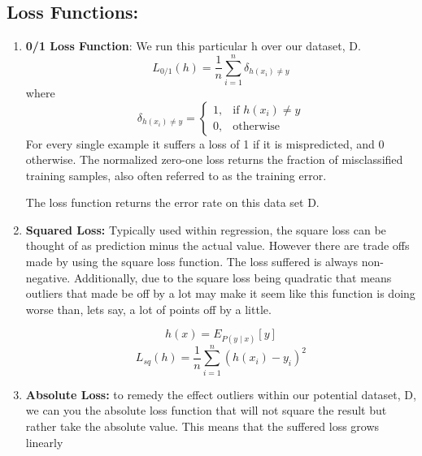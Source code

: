 \documentclass{article}
\begin{document}
    \subsection{Loss Functions:}
    \begin{enumerate}
        \item \textbf{0/1 Loss Function}:
            We run this particular h over our dataset, D.
            \begin{equation}
                L_{0/1}(h) = \frac{1}{n}\sum_{i=1}^{n} \delta_{h(x_i)\neq y}
            \end{equation}
            where
            \begin{equation}
                \delta_{h(x_i)\neq y} = \begin{cases}
                                            1,& \text{if } h(x_i)\neq y\\
                                            0,& \text{otherwise}
                                        \end{cases}
            \end{equation}
            For every single example it suffers a loss of 1 if it is mispredicted, and 0 otherwise. The normalized zero-one loss returns the fraction of misclassified training samples, also often referred to as the training error.
            
            The loss function returns the error rate on this data set D. 
            
        \item \textbf{Squared Loss:}
            Typically used within regression, the square loss can be thought of as prediction minus the actual value. However there are trade offs made by using the square loss function. The loss suffered is always non-negative. Additionally, due to the square loss being quadratic that means outliers that made be off by a lot may make it seem like this function is doing worse than, lets say, a lot of points off by a little. 
            
            \begin{equation}
                h(x) = E_{P(y\mid x)}[y]
            \end{equation}
            \begin{equation}
                L_{sq}(h) = \frac{1}{n} \sum_{i=1}^{n} (h(x_i)-y_{i})^2
            \end{equation}
            
        \item \textbf{Absolute Loss:}
            to remedy the effect outliers within our potential dataset, D, we can you the absolute loss function that will not square the result but rather take the absolute value. This means that the suffered loss grows linearly 
            

\end{enumerate}
\end{document}
